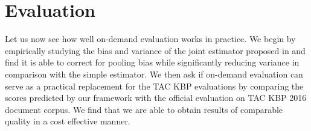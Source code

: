 \section{Evaluation}
\label{sec:evaluation}

Let us now see how well on-demand evaluation works in practice.
We begin by empirically studying the bias and variance of the joint estimator proposed in  and find it is able to correct for pooling bias while significantly reducing variance in comparison with the simple estimator.
We then ask if on-demand evaluation can serve as a practical replacement for the TAC KBP evaluations by comparing the scores predicted by our framework with the official evaluation on TAC KBP 2016 document corpus.
We find that we are able to obtain results of comparable quality in a cost effective manner.

